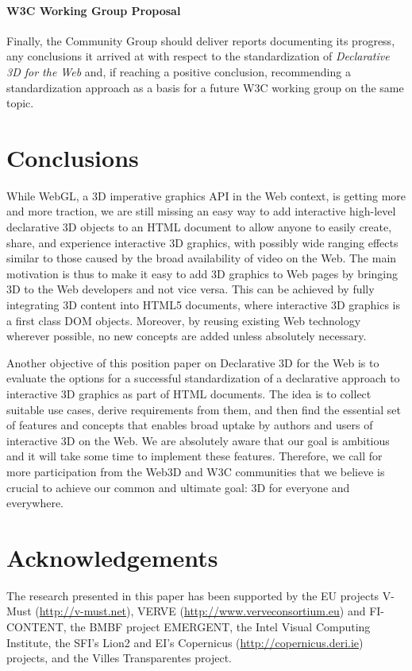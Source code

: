 \documentclass{acmsiggraph}
\begin{document}
\paragraph{W3C Working Group Proposal}
Finally, the Community Group should deliver reports documenting its progress, any conclusions it arrived at with respect to the standardization of \textit{Declarative 3D for the Web} and, if reaching a positive conclusion, recommending a standardization approach as a basis for a future W3C working group on the same topic.


\section{Conclusions}
\label{sec:Conclusions}

While WebGL, a 3D imperative graphics API in the Web context, is getting more and more traction, we are still missing an easy way to add interactive high-level declarative 3D objects to an HTML document to allow anyone to easily create, share, and experience interactive 3D graphics, with possibly wide ranging effects similar to those caused by the broad availability of video on the Web.
The main motivation is thus to make it easy to add 3D graphics to Web pages by bringing 3D to the Web developers and not vice versa. This can be achieved by fully integrating 3D content into HTML5 documents, where interactive 3D graphics is a first class DOM objects. Moreover, by reusing existing Web technology wherever possible, no new concepts are added unless absolutely necessary.

Another objective of this position paper on Declarative 3D for the Web is to evaluate the options for a successful standardization of a declarative approach to interactive 3D graphics as part of HTML documents. The idea is to collect suitable use cases, derive requirements from them, and then find the essential set of features and concepts that enables broad uptake by authors and users of interactive 3D on the Web.
We are absolutely aware that our goal is ambitious and it will take some time to implement these features. Therefore, we call for more participation from the Web3D and W3C communities that we believe is crucial to achieve our common and ultimate goal: 3D for everyone and everywhere.


\section*{Acknowledgements}
The research presented in this paper has been supported by the EU projects V-Must (\url{http://v-must.net}), VERVE (\url{http://www.verveconsortium.eu}) and FI-CONTENT, the BMBF project EMERGENT, the Intel Visual Computing Institute, the SFI's Lion2 and EI's Copernicus (\url{http://copernicus.deri.ie}) projects, and the Villes Transparentes project.



\end{document}
